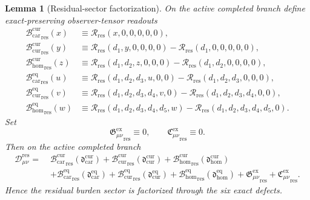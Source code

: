\documentclass[11pt]{article}
\newcommand{\ResidualDec}{\mathcal D_{\mu\nu}^{\mathrm{res}}}
\newcommand{\GaugeExact}{\mathfrak G_{\mu\nu}^{\mathrm{ex}}}
\newcommand{\ConstraintExact}{\mathfrak C_{\mu\nu}^{\mathrm{ex}}}
\newcommand{\TensorCurrentBridge}{\mathcal B_{\mathrm{car}}^{\mathrm{cur}}}
\newcommand{\CurCurrentBridge}{\mathcal B_{\mathrm{cur}}^{\mathrm{cur}}}
\newcommand{\HomCurrentBridge}{\mathcal B_{\mathrm{hom}}^{\mathrm{cur}}}
\newcommand{\TensorEqBridge}{\mathcal B_{\mathrm{car}}^{\mathrm{eq}}}
\newcommand{\CurEqBridge}{\mathcal B_{\mathrm{cur}}^{\mathrm{eq}}}
\newcommand{\HomEqBridge}{\mathcal B_{\mathrm{hom}}^{\mathrm{eq}}}
\newcommand{\ResidualRead}{\mathscr R_{\mathrm{res}}}
\newtheorem{lemma}{Lemma}
\begin{document}
\begin{lemma}[Residual-sector factorization]
\label{lem:direct_residual}
On the active completed branch define exact-preserving observer-tensor readouts
\[
\begin{aligned}
{\TensorCurrentBridge}_{\mathrm{res}}(x)
&\equiv
\ResidualRead(x,0,0,0,0,0),
\\
{\CurCurrentBridge}_{\mathrm{res}}(y)
&\equiv
\ResidualRead(d_1,y,0,0,0,0)
-\ResidualRead(d_1,0,0,0,0,0),
\\
{\HomCurrentBridge}_{\mathrm{res}}(z)
&\equiv
\ResidualRead(d_1,d_2,z,0,0,0)
-\ResidualRead(d_1,d_2,0,0,0,0),
\\
{\TensorEqBridge}_{\mathrm{res}}(u)
&\equiv
\ResidualRead(d_1,d_2,d_3,u,0,0)
-\ResidualRead(d_1,d_2,d_3,0,0,0),
\\
{\CurEqBridge}_{\mathrm{res}}(v)
&\equiv
\ResidualRead(d_1,d_2,d_3,d_4,v,0)
-\ResidualRead(d_1,d_2,d_3,d_4,0,0),
\\
{\HomEqBridge}_{\mathrm{res}}(w)
&\equiv
\ResidualRead(d_1,d_2,d_3,d_4,d_5,w)
-\ResidualRead(d_1,d_2,d_3,d_4,d_5,0).
\end{aligned}
\]
Set
\[
{\GaugeExact}_{\mathrm{res}}\equiv 0,
\qquad
{\ConstraintExact}_{\mathrm{res}}\equiv 0.
\]
Then on the active completed branch
\begin{equation}
\begin{aligned}
\ResidualDec
=\;&
{\TensorCurrentBridge}_{\mathrm{res}}\!\left(\mathfrak d_{\mathrm{car}}^{\mathrm{cur}}\right)
+{\CurCurrentBridge}_{\mathrm{res}}\!\left(\mathfrak d_{\mathrm{cur}}^{\mathrm{cur}}\right)
+{\HomCurrentBridge}_{\mathrm{res}}\!\left(\mathfrak d_{\mathrm{hom}}^{\mathrm{cur}}\right)
\\
&+{\TensorEqBridge}_{\mathrm{res}}\!\left(\mathfrak d_{\mathrm{car}}^{\mathrm{eq}}\right)
+{\CurEqBridge}_{\mathrm{res}}\!\left(\mathfrak d_{\mathrm{cur}}^{\mathrm{eq}}\right)
+{\HomEqBridge}_{\mathrm{res}}\!\left(\mathfrak d_{\mathrm{hom}}^{\mathrm{eq}}\right)
+{\GaugeExact}_{\mathrm{res}}+{\ConstraintExact}_{\mathrm{res}}.
\end{aligned}
\label{eq:direct_bridge_residual}
\end{equation}
Hence the residual burden sector is factorized through the six exact defects.
\end{lemma}
\end{document}
